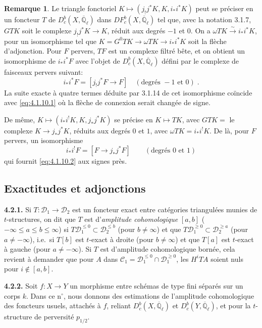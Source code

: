 \documentclass[12pt,a4paper]{article}
\theoremstyle{plain}
\theoremstyle{definition}
\newtheorem{remark}[theorem]{Remarque}
\newcommand{\cC}{\mathcal{C}}
\newcommand{\cD}{\mathcal{D}}
\newcommand{\isom}{\xrightarrow{\sim}}
\providecommand{\cC}{\mathcal{C}}
\providecommand{\cD}{\mathcal{D}}
\begin{document}
\begin{remark}\label{rem:4.1.13}
Le triangle fonctoriel $K \longmapsto (j_{!}j^{*}K, K, i_{*}i^{*}K)$ peut se pr\'{e}ciser en un foncteur $T$ de $D_{c}^{b}(X,\overline{\mathbb{Q}}_{\ell})$ dans $DF_{c}^{b}(X,\overline{\mathbb{Q}}_{\ell})$ tel que, avec la notation 3.1.7, $GTK$ soit le complexe $j_{!}j^{*}K \longrightarrow K$, r\'{e}duit aux degr\'{e}s $-1$ et $0$. On a $\omega TK \isom i_{*}i^{*}K$, pour un isomorphisme tel que $K = G^{0}TK \to \omega TK \longrightarrow i_{*}i^{*}K$ soit la fl\`{e}che d'adjonction. Pour $F$ pervers, $TF$ est un complexe filtr\'{e} b\^{e}te, et on obtient un isomorphisme de $i_{*}i^{*}F$ avec l'objet de $D_{c}^{b}(X,\overline{\mathbb{Q}}_{\ell})$ d\'{e}fini par le complexe de faisceaux pervers suivant:
\[
i_{*}i^{*}F = [j_{!}j^{*}F \longrightarrow F] \quad (\text{degr\'{e}s } -1 \text{ et } 0)\;.
\]
La suite exacte \`{a} quatre termes d\'{e}duite par 3.1.14 de cet isomorphisme co\"{i}ncide avec \eqref{eq:4.1.10.1} o\`{u} la fl\`{e}che de connexion serait chang\'{e}e de signe.

De m\^{e}me, $K \longmapsto (i_{*}i^{!}K, K, j_{*}j^{*}K)$ se pr\'{e}cise en $K \longmapsto TK$, avec $GTK =$ le complexe $K \to j_{*}j^{*}K$, r\'{e}duits aux degr\'{e}s $0$ et $1$, avec $\omega TK = i_{*}i^{!}K$. De l\`{a}, pour $F$ pervers, un isomorphisme
\[
i_{*}i^{!}F = [F \to j_{*}j^{*}F] \qquad (\text{degr\'{e}s } 0 \text{ et } 1)
\]
qui fournit \eqref{eq:4.1.10.2} aux signes pr\`{e}s.
\end{remark}

\subsection{Exactitudes et adjonctions}

\noindent\textbf{4.2.1.} Si $T: \cD_{1} \to \cD_{2}$ est un foncteur exact entre cat\'{e}gories triangul\'{e}es munies de $t$-structures, on dit que $T$ est d'\emph{amplitude cohomologique} $[a,b]$ ($-\infty \leq a \leq b \leq \infty$) si $T\cD_{1}^{\leq 0} \subset \cD_{2}^{\leq b}$ (pour $b \neq \infty$) et que $T\cD_{1}^{\geq 0} \subset \cD_{2}^{\geq a}$ (pour $a \neq -\infty$), i.e.\ si $T[b]$ est $t$-exact \`{a} droite (pour $b \neq \infty$) et que $T[a]$ est $t$-exact \`{a} gauche (pour $a \neq -\infty$). Si $T$ est d'amplitude cohomologique born\'{e}e, cela revient \`{a} demander que pour $A$ dans $\cC_{1} = \cD_{1}^{\leq 0} \cap \cD_{1}^{\geq 0}$, les $H^{i}TA$ soient nuls pour $i \notin [a,b]$.

\noindent\textbf{4.2.2.} Soit $f: X \longrightarrow Y$ un morphisme entre sch\'{e}mas de type fini s\'{e}par\'{e}s sur un corps $k$. Dans ce n$^{\circ}$, nous donnons des estimations de l'amplitude cohomologique des foncteurs usuels, attach\'{e}s \`{a} $f$, reliant $D_{c}^{b}(X,\overline{\mathbb{Q}}_{\ell})$ et $D_{c}^{b}(Y,\overline{\mathbb{Q}}_{\ell})$, et pour la $t$-structure de perversit\'{e} $p_{1/2}$.
\end{document}
